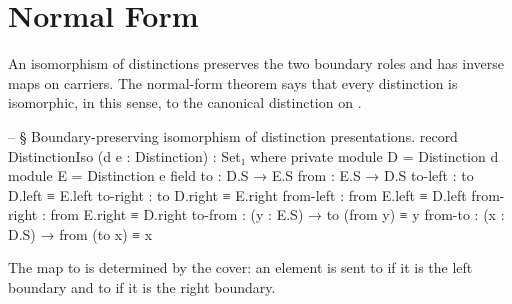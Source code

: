 \documentclass[11pt]{article}
\begin{document}
\section{Normal Form}

An isomorphism of distinctions preserves the two boundary roles and has
inverse maps on carriers.  The normal-form theorem says that every
distinction is isomorphic, in this sense, to the canonical distinction
on .

\begin{code}
-- § Boundary-preserving isomorphism of distinction presentations.
record DistinctionIso (d e : Distinction) : Set₁ where
  private
    module D = Distinction d
    module E = Distinction e
  field
    to         : D.S → E.S
    from       : E.S → D.S
    to-left    : to D.left ≡ E.left
    to-right   : to D.right ≡ E.right
    from-left  : from E.left ≡ D.left
    from-right : from E.right ≡ D.right
    to-from    : (y : E.S) → to (from y) ≡ y
    from-to    : (x : D.S) → from (to x) ≡ x
\end{code}

The map to  is determined by the cover: an element is sent
to  if it is the left boundary and to
 if it is the right boundary.

\begin{center}
\end{center}
\end{document}
